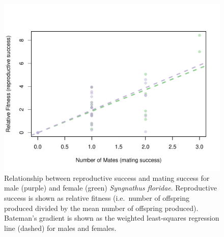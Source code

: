 \documentclass[
]{article}
\begin{document}
\begin{figure}
\centering
\includegraphics{selection_analysis_floridae_files/figure-latex/unnamed-chunk-1-1.pdf}
\caption{\label{fig:unnamed-chunk-1}Relationship between reproductive success and mating success for male (purple) and female (green) \emph{Syngnathus floridae}. Reproductive success is shown as relative fitness (i.e.~number of offspring produced divided by the mean number of offspring produced). Bateman's gradient is shown as the weighted least-squares regression line (dashed) for males and females.}
\end{figure}
\end{document}
